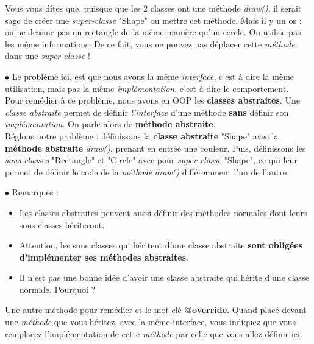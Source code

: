 Vous vous dîtes que, puisque que les 2 classes ont une méthode \textit{draw()}, il serait sage de créer une \textit{super-classe} "Shape" ou mettre cet méthode. Mais il y un os : on ne dessine pas un rectangle de la même manière qu'un cercle. On utilise pas les même informations. De ce fait, vous ne pouvez pas déplacer cette \textit{méthode} dans une \textit{super-classe} !

\par $\bullet$ Le problème ici, est que nous avons la même \textit{interface}, c'est à dire la même utilisation, mais pas la même \textit{implémentation}, c'est à dire le comportement.\\

Pour remédier à ce problème, nous avons en OOP les \textbf{classes abstraites}. Une \textit{classe abstraite} permet de définir \textit{l'interface} d'une méthode \textbf{sans} définir son \textit{implémentation}. On parle alors de \textbf{méthode abstraite}.\\

Réglons notre problème : définissons la \textbf{classe abstraite} "Shape" avec la \textbf{méthode abstraite} \textit{draw()}, prenant en entrée une couleur. Puis, définissons les \textit{sous classes} "Rectangle" et "Circle" avec pour \textit{super-classe} "Shape", ce qui leur permet de définir le code de la \textit{méthode} \textit{draw()} différemment l'un de l'autre.

\par $\bullet$ Remarques :
\begin{itemize}
  \item Les classes abstraites peuvent aussi définir des méthodes normales dont leurs sous classes hériteront.

  \item Attention, les sous classes qui héritent d'une classe abstraite \textbf{sont obligées d'implémenter ses méthodes abstraites}.

  \item Il n'est pas une bonne idée d'avoir une classe abstraite qui hérite d'une classe normale. Pourquoi ?

\end{itemize}

\par Une autre méthode pour remédier et le mot-clé \textbf{@override}. Quand placé devant une \textit{méthode} que vous héritez, avec la même interface, vous indiquez que vous remplacez l'implémentation de cette \textit{méthode} par celle que vous allez définir ici.
